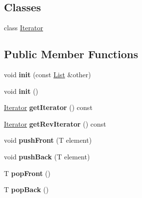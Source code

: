 \subsection*{Classes}
\begin{DoxyCompactItemize}
\item 
class \hyperlink{classDE_1_1List_1_1Iterator}{Iterator}
\end{DoxyCompactItemize}
\subsection*{Public Member Functions}
\begin{DoxyCompactItemize}
\item 
void {\bfseries init} (const \hyperlink{classDE_1_1List}{List} \&other)\hypertarget{classDE_1_1List_a939e1492cec40a32f386fbc3bfd3aad4}{}\label{classDE_1_1List_a939e1492cec40a32f386fbc3bfd3aad4}

\item 
void {\bfseries init} ()\hypertarget{classDE_1_1List_aaeced6c65cd99370cf78a19ba5f33d79}{}\label{classDE_1_1List_aaeced6c65cd99370cf78a19ba5f33d79}

\item 
\hyperlink{classDE_1_1List_1_1Iterator}{Iterator} {\bfseries get\+Iterator} () const \hypertarget{classDE_1_1List_ac3d3291c86f3305c42e335abdc59a742}{}\label{classDE_1_1List_ac3d3291c86f3305c42e335abdc59a742}

\item 
\hyperlink{classDE_1_1List_1_1Iterator}{Iterator} {\bfseries get\+Rev\+Iterator} () const \hypertarget{classDE_1_1List_abbef5a7352be5aa7dc1d83c1f4f97545}{}\label{classDE_1_1List_abbef5a7352be5aa7dc1d83c1f4f97545}

\item 
void {\bfseries push\+Front} (T element)\hypertarget{classDE_1_1List_a5b0ce6f5a23e9dbd8b0eb9ae33b98a90}{}\label{classDE_1_1List_a5b0ce6f5a23e9dbd8b0eb9ae33b98a90}

\item 
void {\bfseries push\+Back} (T element)\hypertarget{classDE_1_1List_a93687c23229ed4963ff46f356c890bb4}{}\label{classDE_1_1List_a93687c23229ed4963ff46f356c890bb4}

\item 
T {\bfseries pop\+Front} ()\hypertarget{classDE_1_1List_ae50e4be01d09c2358cc79ccc56957c8d}{}\label{classDE_1_1List_ae50e4be01d09c2358cc79ccc56957c8d}

\item 
T {\bfseries pop\+Back} ()\hypertarget{classDE_1_1List_a06c1593097f2543ca95b0d3bf5a6238c}{}\label{classDE_1_1List_a06c1593097f2543ca95b0d3bf5a6238c}


\end{DoxyCompactItemize}
